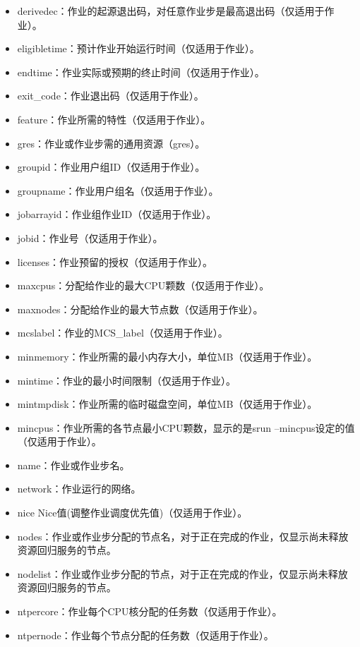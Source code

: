\begin{itemize}
\begin{itemize}
\begin{itemize}
    \item derivedec：作业的起源退出码，对任意作业步是最高退出码（仅适用于作业）。
    \item eligibletime：预计作业开始运行时间（仅适用于作业）。
    \item endtime：作业实际或预期的终止时间（仅适用于作业）。
    \item exit\_code：作业退出码（仅适用于作业）。
    \item feature：作业所需的特性（仅适用于作业）。
    \item gres：作业或作业步需的通用资源（gres）。
    \item groupid：作业用户组ID（仅适用于作业）。
    \item groupname：作业用户组名（仅适用于作业）。
    \item jobarrayid：作业组作业ID（仅适用于作业）。
    \item jobid：作业号（仅适用于作业）。
    \item licenses：作业预留的授权（仅适用于作业）。
    \item maxcpus：分配给作业的最大CPU颗数（仅适用于作业）。
    \item maxnodes：分配给作业的最大节点数（仅适用于作业）。
    \item mcslabel：作业的MCS\_label（仅适用于作业）。
    \item minmemory：作业所需的最小内存大小，单位MB（仅适用于作业）。
    \item mintime：作业的最小时间限制（仅适用于作业）。
    \item mintmpdisk：作业所需的临时磁盘空间，单位MB（仅适用于作业）。
    \item mincpus：作业所需的各节点最小CPU颗数，显示的是srun --mincpus设定的值（仅适用于作业）。
    \item name：作业或作业步名。
    \item network：作业运行的网络。
    \item nice Nice值(调整作业调度优先值)（仅适用于作业）。
    \item nodes：作业或作业步分配的节点名，对于正在完成的作业，仅显示尚未释放资源回归服务的节点。
    \item nodelist：作业或作业步分配的节点，对于正在完成的作业，仅显示尚未释放资源回归服务的节点。
    \item ntpercore：作业每个CPU核分配的任务数（仅适用于作业）。
    \item ntpernode：作业每个节点分配的任务数（仅适用于作业）。

\end{itemize}
\end{itemize}
\end{itemize}

